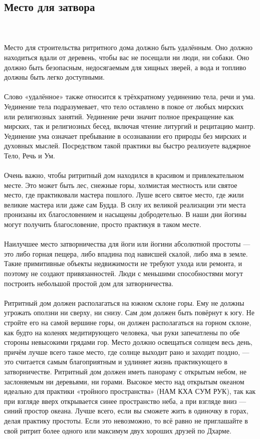 \subsection{Место для затвора}
\\ \\ Место для строительства ритритного дома должно быть удалённым.
      Оно должно находиться вдали от деревень, чтобы вас не посещали ни люди, ни собаки.
      Оно должно быть безопасным, недосягаемым для хищных зверей, а вода и топливо должны
      быть легко доступными.
\\ \\ Слово «удалённое» также относится к трёхкратному уедине\-нию тела, речи и ума. Уединение тела подразумевает, что тело оставлено в покое от любых мирских или религиозных занятий. Уединение речи значит полное прекращение как мирских, так и религиозных бесед, включая чтение литургий и рецитацию мантр. Уединение ума означает пребывание в осознавании его природы без мирских и духовных мыслей. Посредством такой практики вы быстро реализуете ваджрное Тело, Речь и Ум.
\\ \\ Очень важно, чтобы ритритный дом находился в красивом и привлекательном месте. Это может быть лес, снежные горы, холмистая местность или святое место, где практиковали мастера пошлого. Луше всего святое место, где жили великие мастера или даже сам Будда. В силу их великой реализации эти места пронизаны их благословением и насыщены добродетелью. В наши дни йогины могут получить благословение, просто практикуя в таком месте.
\\ \\ Наилучшее место затворничества для йоги или йогини абсолютной простоты — это либо горная пещера, либо впадина под нависшей скалой, либо яма в земле. Такие примитивные объекты недвижимости не требуют ухода или ремонта, и поэтому не создают привязанностей. Люди с меньшими способностями могут построить небольшой простой дом для затворничества.
\\ \\ Ритритный дом должен располагаться на южном склоне горы. Ему не должны угрожать оползни ни сверху, ни снизу. Сам дом должен быть повёрнут к югу. Не стройте его на самой вершине горы, он должен располагаться на горном склоне, как будто на коленях медитирующего человека, чьи руки запечатлены по обе стороны невысокими грядами гор. Место должно освещаться солнцем весь день, причём лучше всего такое место, где солнце выходит рано и заходит поздно, — это считается самым благоприятным и удлиняет жизнь практикующего в затворничестве. Ритритный дом должен иметь панораму с открытым небом, не заслоняемым ни деревьями, ни горами. Высокое место над открытым океаном идеально для практики «тройного пространства» (НАМ КХА СУМ РУК), так как при взгляде вверх открывается синее пространство неба, а при взгляде вниз — синий простор океана. Лучше всего, если вы сможете жить в одиночку в горах, делая практику простоты. Если это невозможно, то всё равно не приглашайте в свой ритрит более одного или максимум двух хороших друзей по Дхарме.
